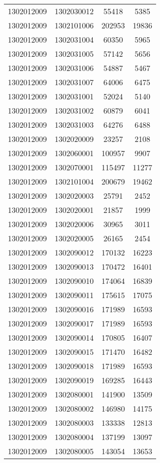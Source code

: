 \begin{longtable}{llcc}
1302012009 & 1302030012 & 55418 & 5385\\
1302012009 & 1302101006 & 202953 & 19836\\
1302012009 & 1302031004 & 60350 & 5965\\
1302012009 & 1302031005 & 57142 & 5656\\
1302012009 & 1302031006 & 54887 & 5467\\
1302012009 & 1302031007 & 64006 & 6475\\
1302012009 & 1302031001 & 52024 & 5140\\
1302012009 & 1302031002 & 60879 & 6041\\
1302012009 & 1302031003 & 64276 & 6488\\
1302012009 & 1302020009 & 23257 & 2108\\
1302012009 & 1302060001 & 100957 & 9907\\
1302012009 & 1302070001 & 115497 & 11277\\
1302012009 & 1302101004 & 200679 & 19462\\
1302012009 & 1302020003 & 25791 & 2452\\
1302012009 & 1302020001 & 21857 & 1999\\
1302012009 & 1302020006 & 30965 & 3011\\
1302012009 & 1302020005 & 26165 & 2454\\
1302012009 & 1302090012 & 170132 & 16223\\
1302012009 & 1302090013 & 170472 & 16401\\
1302012009 & 1302090010 & 174064 & 16839\\
1302012009 & 1302090011 & 175615 & 17075\\
1302012009 & 1302090016 & 171989 & 16593\\
1302012009 & 1302090017 & 171989 & 16593\\
1302012009 & 1302090014 & 170805 & 16407\\
1302012009 & 1302090015 & 171470 & 16482\\
1302012009 & 1302090018 & 171989 & 16593\\
1302012009 & 1302090019 & 169285 & 16443\\
1302012009 & 1302080001 & 141900 & 13509\\
1302012009 & 1302080002 & 146980 & 14175\\
1302012009 & 1302080003 & 133338 & 12813\\
1302012009 & 1302080004 & 137199 & 13097\\
1302012009 & 1302080005 & 143054 & 13653\\

\end{longtable}
